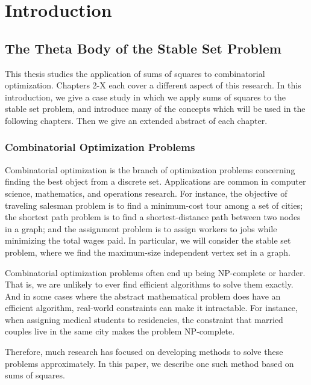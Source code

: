 


\chapter{Introduction}
\label{chap:Introduction}

\section{The Theta Body of the Stable Set Problem}
This thesis studies the application of sums of squares to combinatorial
optimization. Chapters 2-X each cover a different aspect of this research.
In this introduction, we give a case study in which we apply sums of squares
to the stable set problem, and introduce many of the concepts which will be 
used in the following chapters. Then we give an extended abstract of each
chapter.

\subsection{Combinatorial Optimization Problems}
Combinatorial optimization is the branch of optimization problems concerning
finding the best object from a discrete set. Applications are common in 
computer science, mathematics, and operations research. For instance, the 
objective of traveling salesman problem is to find a minimum-cost tour among
a set of cities; the shortest path problem is to find a shortest-distance
path between two nodes in a graph; and the assignment problem is to assign
workers to jobs while minimizing the total wages paid. In particular, we will
consider the 
stable set problem, where we find the maximum-size independent vertex set in a
graph.

Combinatorial optimization problems often end up being NP-complete or harder.
That is, we are unlikely to ever find efficient algorithms to solve them
exactly. And in some cases where the abstract mathematical problem does have
an efficient algorithm, real-world constraints can make it intractable. For
instance, when assigning medical students to residencies, the constraint that
married couples live in the same city makes the problem NP-complete.

Therefore, much research has focused on developing methods to solve these
problems approximately. In this paper, we describe one such method based on
sums of squares.

